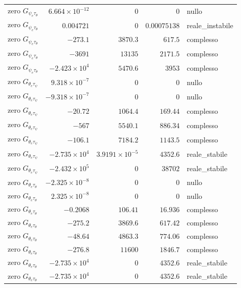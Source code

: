\documentclass[10pt,a4paper]{article}
\numberwithin{equation}{section}
\begin{document}
\begin{longtable}{lrrrl}
\midrule
zero $G_{\psi_e\tau_\theta}$ & $6.664\times10^{-12}$ & $0$ & $0$ & nullo \\
zero $G_{\psi_e\tau_\theta}$ & $0.004721$ & $0$ & $0.00075138$ & reale\_instabile \\
zero $G_{\psi_e\tau_\theta}$ & $-273.1$ & $3870.3$ & $617.5$ & complesso \\
zero $G_{\psi_e\tau_\theta}$ & $-3691$ & $13135$ & $2171.5$ & complesso \\
zero $G_{\psi_e\tau_\theta}$ & $-2.423\times10^{4}$ & $5470.6$ & $3953$ & complesso \\
\midrule
zero $G_{\theta_e\tau_\psi}$ & $9.318\times10^{-7}$ & $0$ & $0$ & nullo \\
zero $G_{\theta_e\tau_\psi}$ & $-9.318\times10^{-7}$ & $0$ & $0$ & nullo \\
zero $G_{\theta_e\tau_\psi}$ & $-20.72$ & $1064.4$ & $169.44$ & complesso \\
zero $G_{\theta_e\tau_\psi}$ & $-567$ & $5540.1$ & $886.34$ & complesso \\
zero $G_{\theta_e\tau_\psi}$ & $-106.1$ & $7184.2$ & $1143.5$ & complesso \\
zero $G_{\theta_e\tau_\psi}$ & $-2.735\times10^{4}$ & $3.9191\times10^{-5}$ & $4352.6$ & reale\_stabile \\
zero $G_{\theta_e\tau_\psi}$ & $-2.432\times10^{5}$ & $0$ & $38702$ & reale\_stabile \\
\midrule
zero $G_{\theta_e\tau_\theta}$ & $-2.325\times10^{-8}$ & $0$ & $0$ & nullo \\
zero $G_{\theta_e\tau_\theta}$ & $2.325\times10^{-8}$ & $0$ & $0$ & nullo \\
zero $G_{\theta_e\tau_\theta}$ & $-0.2068$ & $106.41$ & $16.936$ & complesso \\
zero $G_{\theta_e\tau_\theta}$ & $-275.2$ & $3869.6$ & $617.42$ & complesso \\
zero $G_{\theta_e\tau_\theta}$ & $-48.64$ & $4863.3$ & $774.06$ & complesso \\
zero $G_{\theta_e\tau_\theta}$ & $-276.8$ & $11600$ & $1846.7$ & complesso \\
zero $G_{\theta_e\tau_\theta}$ & $-2.735\times10^{4}$ & $0$ & $4352.6$ & reale\_stabile \\
zero $G_{\theta_e\tau_\theta}$ & $-2.735\times10^{4}$ & $0$ & $4352.6$ & reale\_stabile \\
\bottomrule\end{longtable}
\end{document}
